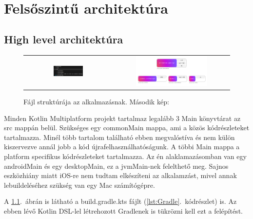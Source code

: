 \chapter{Felsőszintű architektúra}
\label{sec:Architecture}

\section{High level architektúra}
\label{sec:HighLevelArchitecture}

\begin{figure}[!ht]
    \centering
    \begin{tabular}{cc} %
        \includegraphics[width=0.35\textwidth, keepaspectratio]{figures/KmpFileStructure.png} & 
        \includegraphics[width=0.65\textwidth, keepaspectratio]{figures/specific-target-diagram.png}
    \end{tabular}
    \caption{Fájl struktúrája az alkalmazásnak. Második kép: \cite{BasicProject}}
    \label{fig:FileStructure}
\end{figure}

Minden Kotlin Multiplatform projekt tartalmaz legalább 3 Main könyvtárat az src mappán belül.
Szükséges egy commonMain mappa, ami a közös kódrészleteket tartalmazza. Minél több tartalom található ebben megvalóstíva és nem külön kiszervezve annál jobb a kód újrafelhasználhatóságunk.
A többi Main mappa a platform specifikus kódrészleteket tartalmazza. Az én alaklamazásomban van egy androidMain és egy desktopMain, ez a jvmMain-nek felelthető meg.
Sajnos eszközhiány miatt iOS-re nem tudtam elkészíteni az alkalamzást, mivel annak lebuildeléséhez szükség van egy Mac számítógépre.

A \ref{fig:FileStructure}.~ábrán is látható a build.gradle.kts fájlt (\ref{lst:Gradle}.~kódrészlet) is. Az ebben lévő Kotlin DSL-lel létrehozott Gradlenek is tükrözni kell ezt a felépítést.

